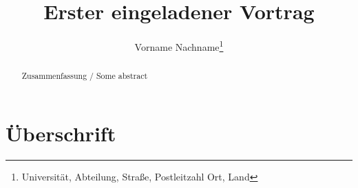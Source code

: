 \documentclass[]{lni}
\begin{document}
\title{Erster eingeladener Vortrag}
\author[Vorname Nachname]
{Vorname Nachname\footnote{Universität, Abteilung, Straße, Postleitzahl Ort,
Land }}
\maketitle

\begin{abstract}
Zusammenfassung / Some abstract
\end{abstract}
\section{Überschrift}
\blindtext
\end{document}
